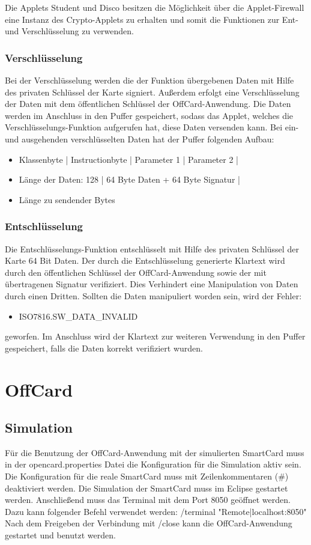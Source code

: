 Die Applets Student und Disco besitzen die Möglichkeit über die Applet-Firewall eine Instanz des Crypto-Applets zu erhalten und somit die Funktionen zur Ent- und Verschlüsselung zu verwenden.

\subsubsection{Verschlüsselung}
Bei der Verschlüsselung werden die der Funktion übergebenen Daten mit Hilfe des privaten Schlüssel der Karte signiert.
Außerdem erfolgt eine Verschlüsselung der Daten mit dem öffentlichen Schlüssel der OffCard-Anwendung.
Die Daten werden im Anschluss in den Puffer gespeichert, sodass das Applet, welches die Verschlüsselungs-Funktion aufgerufen hat, diese Daten versenden kann.
Bei ein- und ausgehenden verschlüsselten Daten hat der Puffer folgenden Aufbau:
\begin{itemize}
	\item[] Klassenbyte | Instructionbyte | Parameter 1 | Parameter 2 |
	\item[] Länge der Daten: 128 | 64 Byte Daten + 64 Byte Signatur | 
	\item[] Länge zu sendender Bytes
\end{itemize}

\subsubsection{Entschlüsselung}
Die Entschlüsselungs-Funktion entschlüsselt mit Hilfe des privaten Schlüssel der Karte 64 Bit Daten.
Der durch die Entschlüsselung generierte Klartext wird durch den öffentlichen Schlüssel der OffCard-Anwendung sowie der mit übertragenen Signatur verifiziert.
Dies Verhindert eine Manipulation von Daten durch einen Dritten.
Sollten die Daten manipuliert worden sein, wird der Fehler:
\begin{itemize}
	\item ISO7816.SW\_DATA\_INVALID
\end{itemize}
geworfen. 
Im Anschluss wird der Klartext zur weiteren Verwendung in den Puffer gespeichert, falls die Daten korrekt verifiziert wurden.

\section{OffCard}
\subsection{Simulation}
Für die Benutzung der OffCard-Anwendung mit der simulierten SmartCard muss in der opencard.properties Datei die Konfiguration für die Simulation aktiv sein.
Die Konfiguration für die reale SmartCard muss mit Zeilenkommentaren (\#) deaktiviert werden.
Die Simulation der SmartCard muss im Eclipse gestartet werden.
Anschließend muss das Terminal mit dem Port 8050 geöffnet werden. 
Dazu kann folgender Befehl verwendet werden:
/terminal "Remote|localhost:8050"
Nach dem Freigeben der Verbindung mit /close kann die OffCard-Anwendung gestartet und benutzt werden.

